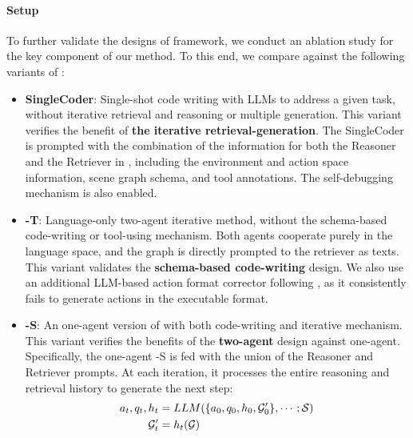 \paragraph{Setup} To further validate the designs of \RwR framework, we conduct an ablation study for the key component of our method. To this end, we compare against the following variants of \RwR:
\begin{itemize}
    \item \textbf{SingleCoder}: 
    Single-shot code writing with LLMs to address a given task, without iterative retrieval and reasoning or multiple generation. This variant verifies the benefit of \textbf{the iterative retrieval-generation}.
    The SingleCoder is prompted with the combination of the information for both the Reasoner and the Retriever in \RwR, including the environment and action space information, scene graph schema, and tool annotations. The self-debugging mechanism is also enabled.

    \item \textbf{\RwR-T}: 
    Language-only two-agent iterative method, without the schema-based code-writing or tool-using mechanism. Both agents cooperate purely in the language space, and the graph is directly prompted to the retriever as texts. This variant validates the \textbf{schema-based code-writing} design. We also use an additional LLM-based action format corrector following \citep{LLMPlanner, groundedDecoding}, as it consistently fails to generate actions in the executable format.

    \item \textbf{\RwR-S}: 
    An one-agent version of \RwR with both code-writing and iterative mechanism. This variant verifies the benefits of the \textbf{two-agent} design against one-agent. Specifically, the one-agent \RwR-S is fed with the union of the Reasoner and Retriever prompts. At each iteration, it processes the entire reasoning and retrieval history to generate the next step:
    \begin{align}
        a_t, q_t, h_t &= LLM(\{a_0, q_0, h_0, {\mathcal{G}}^\prime_0\}, \cdots; {\mathcal{S}}) \\
        {\mathcal{G}}^\prime_{t} &= h_t({\mathcal{G}})
        \end{align}
    \end{itemize}
    
